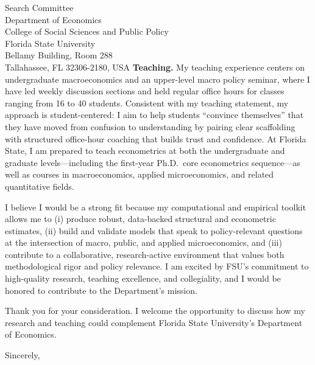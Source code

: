 \documentclass[11pt,letterpaper]{letter}
\begin{document}
\begin{letter}{Search Committee \\
Department of Economics \\
College of Social Sciences and Public Policy \\
Florida State University \\
Bellamy Building, Room 288 \\
Tallahassee, FL 32306-2180, USA}
\textbf{Teaching.} My teaching experience centers on undergraduate macroeconomics and an upper-level macro policy seminar, where I have led weekly discussion sections and held regular office hours for classes ranging from 16 to 40 students. Consistent with my teaching statement, my approach is student-centered: I aim to help students ``convince themselves'' that they have moved from confusion to understanding by pairing clear scaffolding with structured office-hour coaching that builds trust and confidence. At Florida State, I am prepared to teach econometrics at both the undergraduate and graduate levels—including the first-year Ph.D.\ core econometrics sequence—as well as courses in macroeconomics, applied microeconomics, and related quantitative fields.

I believe I would be a strong fit because my computational and empirical toolkit allows me to (i) produce robust, data-backed structural and econometric estimates, (ii) build and validate models that speak to policy-relevant questions at the intersection of macro, public, and applied microeconomics, and (iii) contribute to a collaborative, research-active environment that values both methodological rigor and policy relevance. I am excited by FSU’s commitment to high-quality research, teaching excellence, and collegiality, and I would be honored to contribute to the Department’s mission.

Thank you for your consideration. I welcome the opportunity to discuss how my research and teaching could complement Florida State University’s Department of Economics.

\closing{Sincerely,}

\end{letter}
\end{document}

